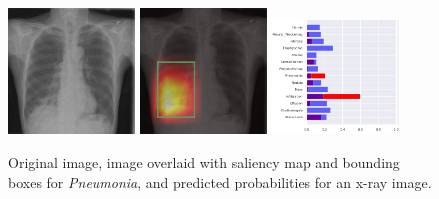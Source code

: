 \documentclass[8pt]{beamer}
\begin{document}
\begin{frame}
\begin{figure}[H]
  \centering
  \includegraphics[width=0.3\textwidth]{images/preds/pneumonia}\hspace{0.01\textwidth}%
  \includegraphics[width=0.3\textwidth]{images/preds/pneumonia_cam}\hspace{0.01\textwidth}%
  \includegraphics[width=0.3\textwidth]{images/preds/pneumonia_probs}\\[0.01\textwidth]
  \caption{Original image, image overlaid with saliency map and bounding boxes
    for \emph{Pneumonia}, and predicted probabilities for an x-ray image.}
  \label{examples_7}
\end{figure}
\end{frame}
\end{document}
